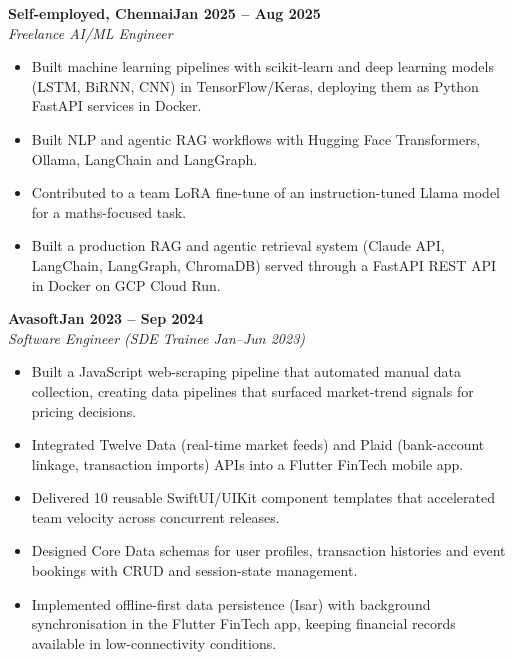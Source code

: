 \documentclass[a4paper,11pt]{article}
\newcommand{\entry}[4]{\needspace{4\baselineskip}\noindent\textbf{#1}\hfill\textbf{#2}\\ \textit{#3}\hfill\textit{#4}\par}
\begin{document}
\vspace{4pt}
\entry{Self-employed, Chennai}{Jan 2025 – Aug 2025}{Freelance AI/ML Engineer}{}
\begin{itemize}
  \item Built machine learning pipelines with scikit-learn and deep learning models (LSTM, BiRNN, CNN) in TensorFlow/Keras, deploying them as Python FastAPI services in Docker.
  \item Built NLP and agentic RAG workflows with Hugging Face Transformers, Ollama, LangChain and LangGraph.
  \item Contributed to a team LoRA fine-tune of an instruction-tuned Llama model for a maths-focused task.
  \item Built a production RAG and agentic retrieval system (Claude API, LangChain, LangGraph, ChromaDB) served through a FastAPI REST API in Docker on GCP Cloud Run.
\end{itemize}
\vspace{4pt}
\entry{Avasoft}{Jan 2023 – Sep 2024}{Software Engineer (SDE Trainee Jan–Jun 2023)}{}
\begin{itemize}
  \item Built a JavaScript web-scraping pipeline that automated manual data collection, creating data pipelines that surfaced market-trend signals for pricing decisions.
  \item Integrated Twelve Data (real-time market feeds) and Plaid (bank-account linkage, transaction imports) APIs into a Flutter FinTech mobile app.
  \item Delivered 10 reusable SwiftUI/UIKit component templates that accelerated team velocity across concurrent releases.
  \item Designed Core Data schemas for user profiles, transaction histories and event bookings with CRUD and session-state management.
  \item Implemented offline-first data persistence (Isar) with background synchronisation in the Flutter FinTech app, keeping financial records available in low-connectivity conditions.
\end{itemize}

\end{document}
